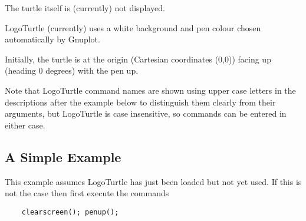 The turtle itself is (currently) not displayed.





LogoTurtle (currently) uses a white background and pen colour chosen
automatically by Gnuplot.

Initially, the turtle is at the origin (Cartesian coordinates (0,0))
facing up (heading 0 degrees) with the pen up.

Note that LogoTurtle command names are shown using upper case letters
in the descriptions after the example below to distinguish them
clearly from their arguments, but LogoTurtle is case insensitive, so
commands can be entered in either case.


\subsection{A Simple Example}

This example assumes LogoTurtle has just been loaded but not yet used.
If this is not the case then first execute the commands
\begin{verbatim}
    clearscreen(); penup();
\end{verbatim}

